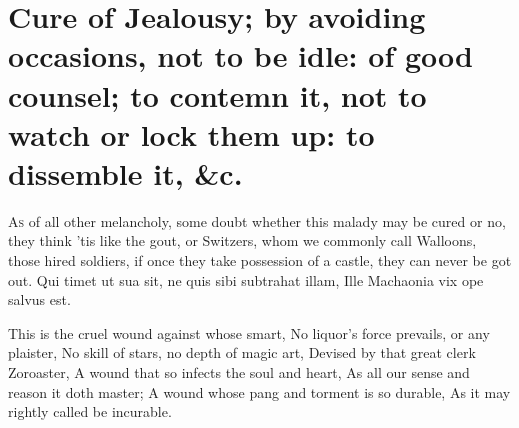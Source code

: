 {%

\section[Cure of Jealousy: by avoiding it]{Cure of Jealousy; by avoiding occasions, not to be idle: of good counsel; to contemn it, not to watch or lock them up: to dissemble it, \&c.}

\lettrine{A}{s} of all other melancholy, some doubt whether this malady may be cured
or no, they think 'tis like the gout, or Switzers, whom we
commonly call Walloons, those hired soldiers, if once they take
possession of a castle, they can never be got out.
Qui timet ut sua sit, ne quis sibi subtrahat illam,
Ille Machaonia vix ope salvus est.

This is the cruel wound against whose smart,
No liquor's force prevails, or any plaister,
No skill of stars, no depth of magic art,
Devised by that great clerk Zoroaster,
A wound that so infects the soul and heart,
As all our sense and reason it doth master;
A wound whose pang and torment is so durable,
As it may rightly called be incurable.

}
